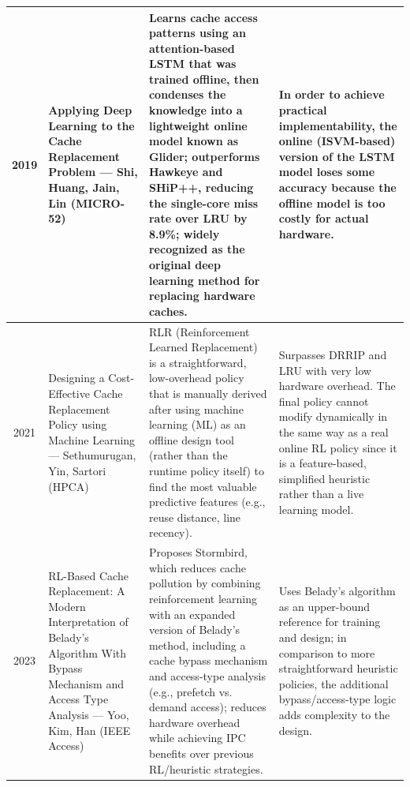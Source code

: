\documentclass[conference]{IEEEtran}
\begin{document}
\begin{table}[!t]
\begin{tabularx}{\textwidth}{c p{3.8cm} X X}
\midrule
2019 & Applying Deep Learning to the Cache Replacement Problem --- Shi, Huang, Jain, Lin (MICRO-52)~\cite{shi2019glider} & Learns cache access patterns using an attention-based LSTM that was trained offline, then condenses the knowledge into a lightweight online model known as Glider; outperforms Hawkeye and SHiP++, reducing the single-core miss rate over LRU by 8.9\%; widely recognized as the original deep learning method for replacing hardware caches. & In order to achieve practical implementability, the online (ISVM-based) version of the LSTM model loses some accuracy because the offline model is too costly for actual hardware. \\
\midrule
2021 & Designing a Cost-Effective Cache Replacement Policy using Machine Learning --- Sethumurugan, Yin, Sartori (HPCA)~\cite{sethumurugan2021rlr} & RLR (Reinforcement Learned Replacement) is a straightforward, low-overhead policy that is manually derived after using machine learning (ML) as an offline design tool (rather than the runtime policy itself) to find the most valuable predictive features (e.g., reuse distance, line recency). & Surpasses DRRIP and LRU with very low hardware overhead. The final policy cannot modify dynamically in the same way as a real online RL policy since it is a feature-based, simplified heuristic rather than a live learning model. \\
\midrule
2023 & RL-Based Cache Replacement: A Modern Interpretation of Belady's Algorithm With Bypass Mechanism and Access Type Analysis --- Yoo, Kim, Han (IEEE Access)~\cite{yoo2023stormbird} & Proposes Stormbird, which reduces cache pollution by combining reinforcement learning with an expanded version of Belady's method, including a cache bypass mechanism and access-type analysis (e.g., prefetch vs. demand access); reduces hardware overhead while achieving IPC benefits over previous RL/heuristic strategies. & Uses Belady's algorithm as an upper-bound reference for training and design; in comparison to more straightforward heuristic policies, the additional bypass/access-type logic adds complexity to the design. \\
\bottomrule
\end{tabularx}
\end{table}

\end{document}
